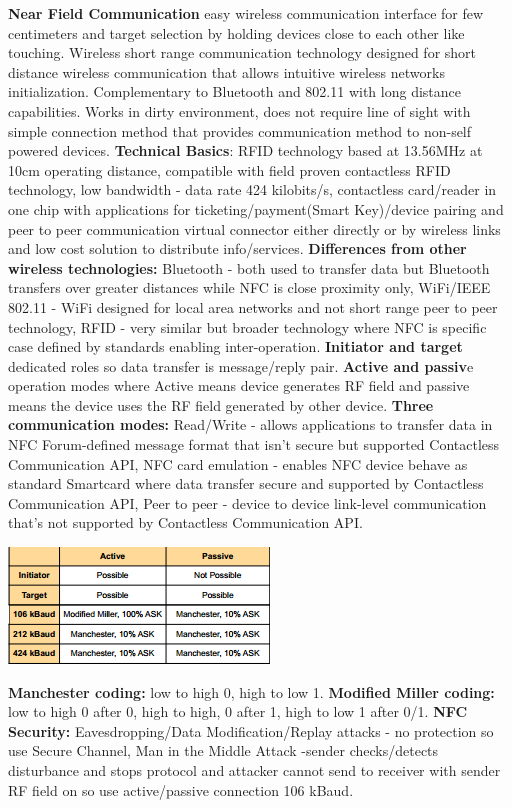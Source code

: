 \documentclass[9pt]{extarticle}
\begin{document}
\begin{multicols}{2}
\textbf{Near Field Communication }easy wireless communication interface for few centimeters and target selection by holding devices close to each other like touching. Wireless short range communication technology designed for short distance wireless communication that allows intuitive wireless networks initialization. Complementary to Bluetooth and 802.11 with long distance capabilities. Works in dirty environment, does not require line of sight with simple connection method that provides communication method to non-self powered devices. \textbf{Technical Basics}: RFID technology based at 13.56MHz at 10cm operating distance, compatible with field proven contactless RFID technology, low bandwidth - data rate 424 kilobits/s, contactless card/reader in one chip with applications for ticketing/payment(Smart Key)/device pairing and peer to peer communication virtual connector either directly or by wireless links and low cost solution to distribute info/services.\textbf{ Differences from other wireless technologies:} Bluetooth - both used to transfer data but Bluetooth transfers over greater distances while NFC is close proximity only,  WiFi/IEEE 802.11 - WiFi designed for local area networks and not short range peer to peer technology, RFID - very similar but broader technology where NFC is specific case defined by standards enabling inter-operation. \textbf{Initiator and target }dedicated roles so data transfer is message/reply pair. \textbf{Active and passiv}e operation modes where Active means device generates RF field and passive means the device uses the RF field generated by other device. \textbf{Three communication modes: }Read/Write - allows applications to transfer data in NFC Forum-defined message format that isn't secure but supported Contactless Communication API, NFC card emulation - enables NFC device behave as standard Smartcard where data transfer secure and supported by Contactless Communication API, Peer to peer - device to device link-level communication that's not supported by Contactless Communication API. 

\includegraphics{moredetails.png}

\textbf{Manchester coding:} low to high 0, high to low 1. \textbf{Modified Miller coding:} low to high 0 after 0, high to high, 0 after 1, high to low 1 after 0/1. \textbf{NFC Security:} Eavesdropping/Data Modification/Replay attacks - no protection so use Secure Channel, Man in the Middle Attack -sender checks/detects disturbance and stops protocol and attacker cannot send to receiver with sender RF field on so use active/passive connection 106 kBaud. 


\end{multicols}
\end{document}
